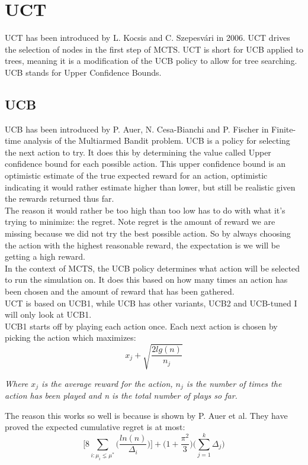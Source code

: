\documentclass[11pt,a4paper]{article}
\begin{document}
\section{UCT}
UCT has been introduced by L. Kocsis and C. Szepesv{\'a}ri in 2006\cite{Kocsis:2006}. UCT drives the selection of nodes in the first step of MCTS. UCT is short for UCB applied to trees, meaning it is a modification of the UCB policy to allow for tree searching. UCB stands for Upper Confidence Bounds.
\subsection{UCB}
UCB has been introduced by P. Auer, N. Cesa-Bianchi and P. Fischer in Finite-time analysis of the Multiarmed Bandit problem\cite{auer2002finite}. UCB is a policy for selecting the next action to try. It does this by determining the value called Upper confidence bound for each possible action. This upper confidence bound is an optimistic estimate of the true expected reward for an action, optimistic indicating it would rather estimate higher than lower, but still be realistic given the rewards returned thus far.\\
The reason it would rather be too high than too low has to do with what it's trying to minimize: the regret. Note regret is the amount of reward we are missing because we did not try the best possible action. So by always choosing the action with the highest reasonable reward, the expectation is we will be getting a high reward.\\
In the context of MCTS, the UCB policy determines what action will be selected to run the simulation on. It does this based on how many times an action has been chosen and the amount of reward that has been gathered.\\

UCT is based on UCB1, while UCB has other variants, UCB2 and UCB-tuned I will only look at UCB1.\\

UCB1 starts off by playing each action once. Each next action is chosen by picking the action which maximizes:
\[
    x_j + \sqrt{\dfrac{2 lg(n)}{n_j}}
\]

\textit{Where $x_j$ is the average reward for the action, $n_j$ is the number of times the action has been played and n is the total number of plays so far.\\}

The reason this works so well is because is shown by P. Auer et al\cite{auer2002finite}. They have proved the expected cumulative regret is at most: 
\[
    \Bigg[ 8 \sum_{i:\mu_i\lneq\mu^*}\bigg(\dfrac{ln(n)}{\Delta_i}\bigg)\Bigg] + \Bigg( 1 + \dfrac{\pi^2}{3}\Bigg)
    \Bigg(\sum_{j=1}^{k}\Delta_j\Bigg)
\]
\end{document}
